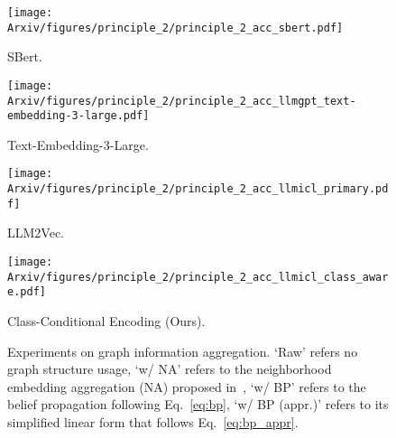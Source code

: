\begin{figure*}[t]
    \centering
    \begin{minipage}{0.22\textwidth}
    \captionsetup{labelformat=empty}
        \centering
        \texttt{[image: Arxiv/figures/principle\_2/principle\_2\_acc\_sbert.pdf]}
        \vspace{-0.5cm}
        \caption*{\scriptsize SBert.}
    \end{minipage}
    \begin{minipage}{0.22\textwidth}
    \captionsetup{labelformat=empty}
        \centering
        \texttt{[image: Arxiv/figures/principle\_2/principle\_2\_acc\_llmgpt\_text-embedding-3-large.pdf]}
        \vspace{-0.5cm}
        \caption*{\scriptsize Text-Embedding-3-Large.}
    \end{minipage}
    \begin{minipage}{0.22\textwidth}
    \captionsetup{labelformat=empty}
        \centering
        \texttt{[image: Arxiv/figures/principle\_2/principle\_2\_acc\_llmicl\_primary.pdf]}
        \vspace{-0.5cm}
        \caption*{\scriptsize LLM2Vec.}
    \end{minipage}
    \begin{minipage}{0.22\textwidth}
    \captionsetup{labelformat=empty}
        \centering
        \texttt{[image: Arxiv/figures/principle\_2/principle\_2\_acc\_llmicl\_class\_aware.pdf]}
        \vspace{-0.5cm}
        \caption*{\scriptsize Class-Conditional Encoding (Ours).}
    \end{minipage}
    \vspace{-0.2cm}
    \caption{Experiments on graph information aggregation. `Raw' refers no graph structure usage, `w/ NA' refers to the neighborhood embedding aggregation (NA) proposed in~\cite{yang2024gl}, `w/ BP' refers to the belief propagation following Eq.~\ref{eq:bp}, `w/ BP (appr.)' refers to its simplified linear form that follows Eq.~\ref{eq:bp_appr}.}
    \label{fig:principle_2}
    \vspace{-0.3cm}
\end{figure*}